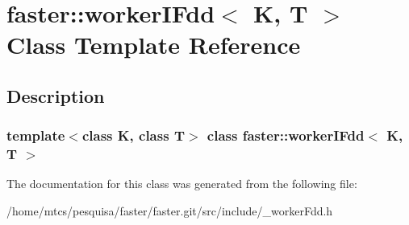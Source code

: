 \hypertarget{classfaster_1_1workerIFdd}{}\section{faster\+:\+:worker\+I\+Fdd$<$ K, T $>$ Class Template Reference}
\label{classfaster_1_1workerIFdd}


\subsection{Description}
\subsubsection*{template$<$class K, class T$>$\newline
class faster\+::worker\+I\+Fdd$<$ K, T $>$}



The documentation for this class was generated from the following file\+:\begin{DoxyCompactItemize}
\item 
/home/mtcs/pesquisa/faster/faster.\+git/src/include/\+\_\+worker\+Fdd.\+h\end{DoxyCompactItemize}
